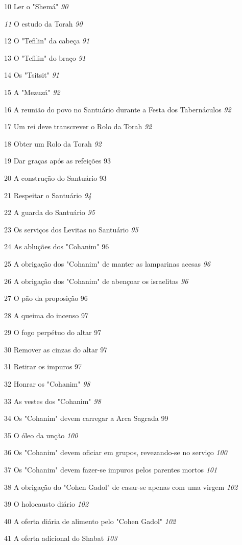 10 Ler o "Shemá" \emph{90}

\emph{11} O estudo da Torah \emph{90}

12 O "Tefilin" da cabeça \emph{91}

13 O "Tefilin" do braço \emph{91}

14 Os "Tsitsit" \emph{91}

15 A "Mezuzá" \emph{92}

16 A reunião do povo no Santuário durante a Festa dos Tabernáculos
\emph{92}

17 Um rei deve transcrever o Rolo da Torah \emph{92}

18 Obter um Rolo da Torah \emph{92}

19 Dar graças após as refeições 93

20 A construção do Santuário 93

21 Respeitar o Santuário \emph{94}

22 A guarda do Santuário \emph{95}

23 Os serviços dos Levitas no Santuário \emph{95}

24 As abluções dos "Cohanim" 96

25 A obrigação dos "Cohanim" de manter as lamparinas acesas \emph{96}

26 A obrigação dos "Cohanim" de abençoar os israelitas \emph{96}

27 O pão da proposição 96

28 A queima do incenso 97

29 O fogo perpétuo do altar 97

30 Remover as cinzas do altar 97

31 Retirar os impuros 97

32 Honrar os "Cohanim" \emph{98}

33 As vestes dos "Cohanim" \emph{98}

34 Os "Cohanim" devem carregar a Arca Sagrada 99

35 O óleo da unção \emph{100}

36 Os "Cohanim" devem oficiar em grupos, revezando-se no serviço
\emph{100}

37 Os "Cohanim" devem fazer-se impuros pelos parentes mortos \emph{101}

38 A obrigação do "Cohen Gadol" de casar-se apenas com uma virgem
\emph{102}

39 O holocausto diário \emph{102}

40 A oferta diária de alimento pelo "Cohen Gadol" \emph{102}

41 A oferta adicional do Shabat \emph{103}

